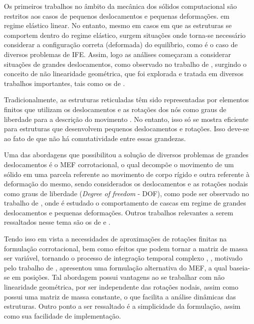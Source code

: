 Os primeiros trabalhos no âmbito da mecânica dos sólidos computacional são restritos aos casos de pequenos deslocamentos e pequenas deformações. em regime elástico linear. No entanto, mesmo em casos em que as estruturas se comportem dentro do regime elástico, surgem situações onde torna-se necessário considerar a configuração correta (deformada) do equilíbrio, como é o caso de diversos problemas de IFE. Assim, logo as análises começaram a considerar situações de grandes deslocamentos, como observado no trabalho de , surgindo o conceito de não linearidade geométrica, que foi explorada e tratada em diversos trabalhos importantes, tais como os de .

Tradicionalmente, as estruturas reticuladas têm sido representadas por elementos finitos que utilizam os deslocamentos e as rotações dos nós como graus de liberdade para a descrição do movimento \cite{reddy2005introduction,assan2020metodo}. No entanto, isso só se mostra eficiente para estruturas que desenvolvem pequenos deslocamentos e rotações. Isso deve-se ao fato de que não há comutatividade entre essas grandezas.

Uma das abordagens que possibilitou a solução de diversos problemas de grandes deslocamentos é o MEF corrotacional, o qual decompõe o movimento de um sólido em uma parcela referente ao movimento de corpo rígido e outra referente à deformação do mesmo, sendo considerados os deslocamentos e as rotações nodais como graus de liberdade (\textit{Degree of freedom} - DOF), como pode ser observado no trabalho de , onde é estudado o comportamento de cascas em regime de grandes deslocamentos e pequenas deformações. Outros trabalhos relevantes a serem ressaltados nesse tema são os de  e .

Tendo isso em vista a necessidades de aproximações de rotações finitas na formulação corrotacional, bem como efeitos que podem tornar a matriz de massa ser variável, tornando o processo de integração temporal complexo \cite{sanches2013unconstrained}, , motivado pelo trabalho de , apresentou uma formulação alternativa do MEF, a qual baseia-se em posições. Tal abordagem possui vantagens ao se trabalhar com não linearidade geométrica, por ser independente das rotações nodais, assim como possui uma matriz de massa constante, o que facilita a análise dinâmicas das estruturas. Outro ponto a ser ressaltado é a simplicidade da formulação, assim como sua facilidade de implementação.

